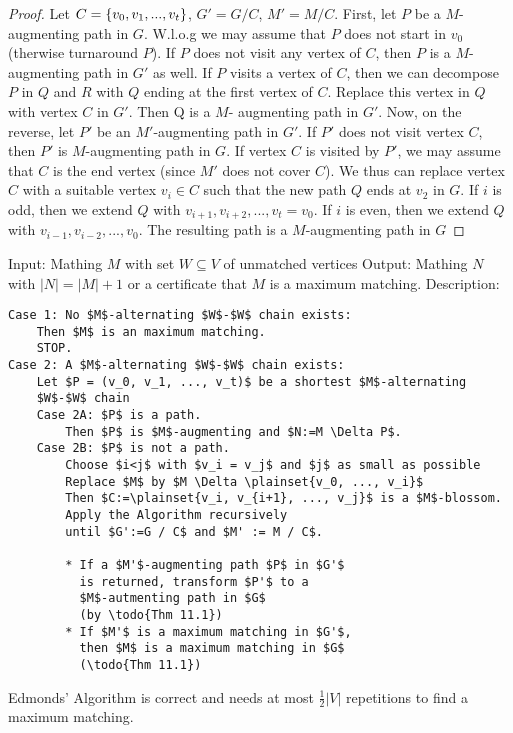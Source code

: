\begin{proof}
	Let $C = \left\{v_0, v_1, ..., v_t\right\}$, $G' = G / C$, $M' = M / C$.
	First, let $P$ be a $M$-augmenting path in $G$.
	W.l.o.g we may assume that $P$ does not start in $v_0$ (therwise turnaround
	$P$).
	If $P$ does not visit any vertex of $C$, then $P$ is a $M$-augmenting
	path in $G'$ as well.
	If $P$ visits a vertex of $C$, then we can decompose $P$ in $Q$ and $R$
	with $Q$ ending at the first vertex of $C$.
	Replace this vertex in $Q$ with vertex $C$ in $G'$. Then Q is a $M$-
	augmenting path in $G'$.
	Now, on the reverse, let $P'$ be an $M'$-augmenting path in $G'$.
	If $P'$ does not visit vertex $C$, then $P'$ is $M$-augmenting path in $G$.
	If vertex $C$ is visited by $P'$, we may assume that $C$ is the end
	vertex (since $M'$ does not cover $C$). We thus can replace vertex $C$
	with a suitable vertex $v_i \in C$ such that the new path $Q$ ends at
	$v_2$ in $G$.
	If $i$ is odd, then we extend $Q$ with $v_{i+1}, v_{i+2}, ..., v_t = v_0$.
	If $i$ is even, then we extend $Q$ with $v_{i-1}, v_{i-2}, ..., v_0$.
	The resulting path is a $M$-augmenting path in $G$
\end{proof}
Input: Mathing $M$ with set $W \subseteq V$ of unmatched vertices
Output: Mathing $N$ with $|N| = |M| + 1$ or a certificate that $M$ is a
maximum matching.
Description:
\begin{lstlisting}
Case 1: No $M$-alternating $W$-$W$ chain exists:
	Then $M$ is an maximum matching. 
	STOP.
Case 2: A $M$-alternating $W$-$W$ chain exists:
	Let $P = (v_0, v_1, ..., v_t)$ be a shortest $M$-alternating 
	$W$-$W$ chain
	Case 2A: $P$ is a path.
		Then $P$ is $M$-augmenting and $N:=M \Delta P$.
	Case 2B: $P$ is not a path.
		Choose $i<j$ with $v_i = v_j$ and $j$ as small as possible
		Replace $M$ by $M \Delta \plainset{v_0, ..., v_i}$
		Then $C:=\plainset{v_i, v_{i+1}, ..., v_j}$ is a $M$-blossom.
		Apply the Algorithm recursively 
		until $G':=G / C$ and $M' := M / C$.
		
		* If a $M'$-augmenting path $P$ in $G'$
		  is returned, transform $P'$ to a 
		  $M$-autmenting path in $G$ 
		  (by \todo{Thm 11.1})
		* If $M'$ is a maximum matching in $G'$, 
		  then $M$ is a maximum matching in $G$
		  (\todo{Thm 11.1})
\end{lstlisting}
\begin{thm}
	Edmonds' Algorithm is correct and needs at most $\frac12 |V|$ repetitions to find a maximum matching.
\end{thm}


